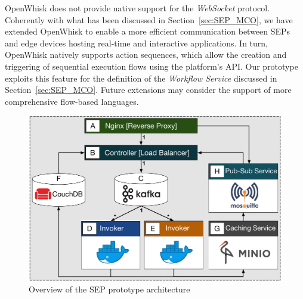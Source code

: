 OpenWhisk does not provide native support for the \textit{WebSocket} protocol. Coherently with what has been discussed in Section~\ref{sec:SEP_MCO}, we have extended OpenWhisk to enable a more efficient communication between SEPs and edge devices hosting real-time and interactive applications. 
In turn, OpenWhisk natively supports action sequences, which allow the creation and triggering of sequential execution flows using the platform's API. Our prototype exploits this feature for the definition of the \textit{Workflow Service} discussed in Section~\ref{sec:SEP_MCO}. Future extensions may consider the support of more comprehensive flow-based languages. %

\begin{figure}[tbp]
	\centering
	\includegraphics[width=1\linewidth]{Figs/Serverless_Edge_Platform_Prototype.pdf}
	\caption{Overview of the SEP prototype architecture}
	\label{fig:Serverless_Edge_Platform_Overview}
\end{figure}

